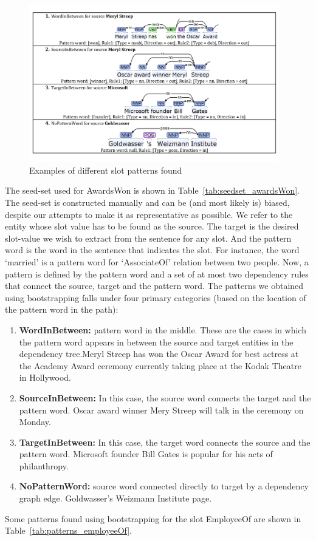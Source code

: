 \begin{itemize}[label={}]
\begin{figure}[t]
	\includegraphics[width=0.97\textwidth]{Examples}
	\caption{Examples of different slot patterns found}
	\label{fig:slotpatternexamples}
\end{figure}

The seed-set used for AwardsWon is shown in Table~\ref{tab:seedset_awardsWon}. The seed-set is constructed manually and can be (and most likely is) biased, despite our attempts to make it as representative as possible. We refer to the entity whose slot value has to be found as the source. The target is the desired slot-value we wish to extract from the sentence for any slot. And the pattern word is the word in the sentence that indicates the slot. For instance, the word ‘married’ is a pattern word for ‘AssociateOf’ relation between two people. Now, a pattern is defined by the pattern word and a set of at most two dependency rules that connect the source, target and the pattern word. The patterns we obtained using bootstrapping falls under four primary categories (based on the location of the pattern word in the path): 
\begin{enumerate}
\item \textbf{WordInBetween:} pattern word in the middle. These are the cases in which the pattern word appears in between the source and target entities in the dependency tree.Meryl Streep has won the Oscar Award for best actress at the Academy Award ceremony currently taking place at the Kodak Theatre in Hollywood.
\item \textbf{SourceInBetween:} In this case, the source word connects the target and the pattern word. Oscar award winner Mery Streep will talk in the ceremony on Monday.
\item \textbf{TargetInBetween:} In this case, the target word connects the source and the pattern word. Microsoft founder Bill Gates is popular for his acts of philanthropy.
\item \textbf{NoPatternWord:} source word connected directly to target by a dependency graph edge. Goldwasser's Weizmann Institute page.
\end{enumerate}
Some patterns found using bootstrapping for the slot EmployeeOf are shown in Table~\ref{tab:patterns_employeeOf}. 


\end{itemize}
